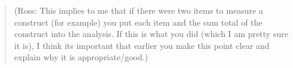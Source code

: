 \documentclass[a4paper,]{book}
\begin{document}
\begin{quote}
(Ross: This implies to me that if there were two items to measure a construct (for example) you put each item and the sum total of the construct into the analysis. If this is what you did (which I am pretty sure it is), I think its important that earlier you make this point clear and explain why it is appropriate/good.)
\end{quote}



\printindex
\end{document}
